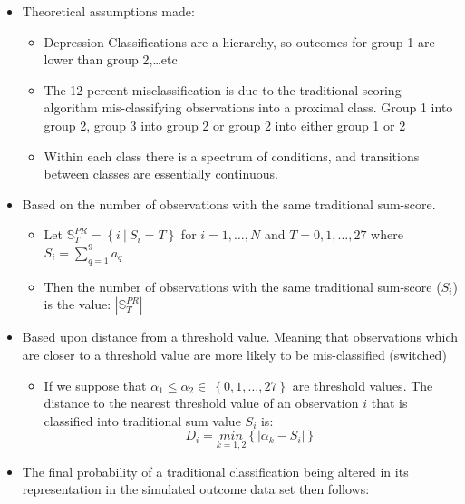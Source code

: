 \documentclass[12pt,]{article}
\providecommand{\tightlist}{%
  \setlength{\itemsep}{0pt}\setlength{\parskip}{0pt}}
\begin{document}
\begin{itemize}
\tightlist
\item
  Theoretical assumptions made:

  \begin{itemize}
  \tightlist
  \item
    Depression Classifications are a hierarchy, so outcomes for group 1
    are lower than group 2,\ldots{}etc
  \item
    The 12 percent misclassification is due to the traditional scoring
    algorithm mis-classifying observations into a proximal class. Group
    1 into group 2, group 3 into group 2 or group 2 into either group 1
    or 2
  \item
    Within each class there is a spectrum of conditions, and transitions
    between classes are essentially continuous.
  \end{itemize}
\item
  Based on the number of observations with the same traditional
  sum-score.

  \begin{itemize}
  \tightlist
  \item
    Let \(\mathbb{S}^{PR}_{T}=\left \{ i\ \Big | \ S_{i}=T \right \}\)
    for \(i=1,\ldots, N\) and \(T=0, 1,\ldots, 27\) where
    \(S_{i} = \sum_{q=1}^{9} a_{q}\)
  \item
    Then the number of observations with the same traditional sum-score
    (\(S_{i}\)) is the value: \(|\mathbb{S}^{PR}_{T}|\)
  \end{itemize}
\item
  Based upon distance from a threshold value. Meaning that observations
  which are closer to a threshold value are more likely to be
  mis-classified (switched)

  \begin{itemize}
  \tightlist
  \item
    If we suppose that
    \(\alpha_{1} \leq \alpha_{2} \in \ \left \{ 0,1,\ldots, 27 \right \}\)
    are threshold values. The distance to the nearest threshold value of
    an observation \(i\) that is classified into traditional sum value
    \(S_{i}\) is:
    \[D_{i} = \underset{k=1,2}{min}\left \{ \Big | \alpha_{k}-S_{i}   \Big | \right \}\]
  \end{itemize}
\item
  The final probability of a traditional classification being altered in
  its representation in the simulated outcome data set then follows:


\end{itemize}
\end{document}
